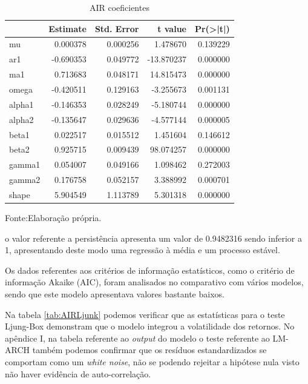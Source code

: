 \documentclass[
  12pt,
  a4paper,
  openany]{book}
\begin{document}
\normalsize

\begin{table}[!h]

\caption{\label{tab:AIRcoefk}AIR coeficientes}
\centering
\begin{tabular}[t]{lrrrr}
\toprule
  &  Estimate &  Std. Error &  t value & Pr(>|t|)\\
\midrule
mu & 0.000378 & 0.000256 & 1.478670 & 0.139229\\
ar1 & -0.690353 & 0.049772 & -13.870237 & 0.000000\\
ma1 & 0.713683 & 0.048171 & 14.815473 & 0.000000\\
omega & -0.420511 & 0.129163 & -3.255673 & 0.001131\\
alpha1 & -0.146353 & 0.028249 & -5.180744 & 0.000000\\
\addlinespace
alpha2 & -0.135647 & 0.029636 & -4.577144 & 0.000005\\
beta1 & 0.022517 & 0.015512 & 1.451604 & 0.146612\\
beta2 & 0.925715 & 0.009439 & 98.074257 & 0.000000\\
gamma1 & 0.054007 & 0.049166 & 1.098462 & 0.272003\\
gamma2 & 0.176758 & 0.052157 & 3.388992 & 0.000701\\
\addlinespace
shape & 5.904549 & 1.113789 & 5.301318 & 0.000000\\
\bottomrule
\end{tabular}
\end{table}
\FloatBarrier
\centering

Fonte:Elaboração própria.

\justifying
\bigskip

o valor referente a persistência apresenta um valor de 0.9482316 sendo inferior a 1, apresentando deste modo uma regressão à média e um processo estável.

Os dados referentes aos critérios de informação estatísticos, como o critério de informação Akaike (AIC), foram analisados no comparativo com vários modelos, sendo que este modelo apresentava valores bastante baixos.

Na tabela \ref{tab:AIRLjunk} podemos verificar que as estatísticas para o teste Ljung-Box demonstram que o modelo integrou a volatilidade dos retornos. No apêndice I, na tabela referente ao \emph{output} do modelo o teste referente ao LM-ARCH também podemos confirmar que os resíduos estandardizados se comportam como um \emph{white noise}, não se podendo rejeitar a hipótese nula visto não haver evidência de auto-correlação.
\end{document}
